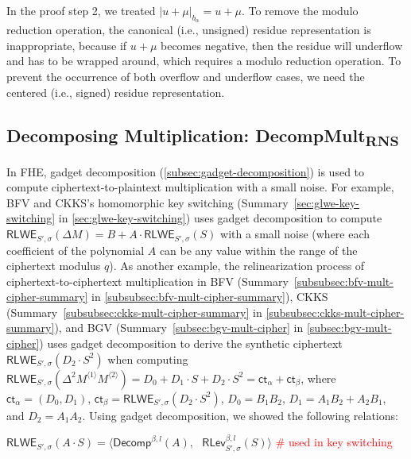  In the proof step 2, we treated $|u + \mu|_{b_\alpha} = u + \mu$. To remove the modulo reduction operation, the canonical (i.e., unsigned) residue representation is inappropriate, because if $u + \mu$ becomes negative, then the residue will underflow and has to be wrapped around, which requires a modulo reduction operation. To prevent the occurrence of both overflow and underflow cases, we need the centered (i.e., signed) residue representation. 






\subsection{Decomposing Multiplication: \textsf{DecompMult\textsubscript{RNS}}}
\label{subsec:rns-decompmult}

In FHE, gadget decomposition (\autoref{subsec:gadget-decomposition}) is used to compute ciphertext-to-plaintext multiplication with a small noise. For example, BFV and CKKS's homomorphic key switching (Summary~\ref*{sec:glwe-key-switching} in \autoref{sec:glwe-key-switching}) uses gadget decomposition to compute $\textsf{RLWE}_{S',\sigma}(\Delta M) = B + A\cdot \textsf{RLWE}_{S', \sigma}(S)$ with a small noise (where each coefficient of the polynomial $A$ can be any value within the range of the ciphertext modulus $q$). As another example, the relinearization process of ciphertext-to-ciphertext multiplication in BFV (Summary~\ref*{subsubsec:bfv-mult-cipher-summary} in \autoref{subsubsec:bfv-mult-cipher-summary}), CKKS (Summary~\ref*{subsubsec:ckks-mult-cipher-summary} in \autoref{subsubsec:ckks-mult-cipher-summary}), and BGV (Summary~\ref*{subsec:bgv-mult-cipher} in \autoref{subsec:bgv-mult-cipher}) uses gadget decomposition to derive the synthetic ciphertext $\textsf{RLWE}_{S', \sigma}(D_2\cdot S^2)$ when computing $\textsf{RLWE}_{S',\sigma}(\Delta^2 M^{\langle 1 \rangle} M^{\langle 2 \rangle}) = D_0 + D_1\cdot S + D_2\cdot S^2 = \textsf{ct}_\alpha + \textsf{ct}_\beta$, where $\textsf{ct}_\alpha = (D_0, D_1)$, $\textsf{ct}_\beta = \textsf{RLWE}_{S', \sigma}(D_2\cdot S^2)$, $D_0 = B_1B_2$, $D_1 = A_1B_2 + A_2B_1$, and $D_2 = A_1A_2$. Using gadget decomposition, we showed the following relations: 

$\textsf{RLWE}_{S', \sigma}(A\cdot S) = \bm{\langle} \textsf{Decomp}^{\beta, l}(A), \text{ } \textsf{RLev}_{S', \sigma}^{\beta, l}(S) \bm{\rangle}$ \textcolor{red}{ \# used in key switching}

